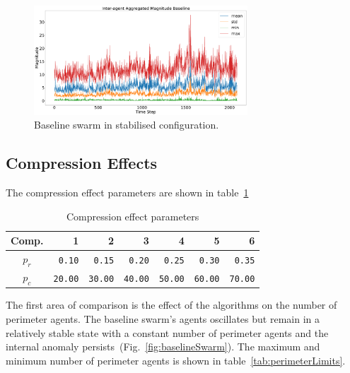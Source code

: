 \documentclass[12pt,a4paper]{IEEEtran}
\begin{document}
\begin{figure}[H]
	\begin{center}
		\includegraphics[width=8cm]{figures/interagentMagnitudeBaseline}
	\end{center}
	\caption{Baseline swarm in stabilised configuration. \label{fig:baselineSwarmMagnitude}}
\end{figure}

\subsection{Compression Effects\label{sec:CompressionEffect}}

The compression effect parameters are shown in table~\ref{tab:compressionEffect}
\begin{table}[h]
	\centering
	\tiny
	\begin{tabular}{|c|r|r|r|r|r|r|}
		\hline
		\rowcolor[HTML]{000000} 
		{\color[HTML]{FFFFFF} Comp.} & {\color[HTML]{FFFFFF} 1} & {\color[HTML]{FFFFFF} 2} & {\color[HTML]{FFFFFF} 3} & {\color[HTML]{FFFFFF} 4} & {\color[HTML]{FFFFFF} 5} & {\color[HTML]{FFFFFF} 6}\\ \hline
		$p_r$ & \texttt{0.10} & \texttt{0.15} & \texttt{0.20} & \texttt{0.25} & \texttt{0.30} & \texttt{0.35} \\ \hline
		$p_c$ & \texttt{20.00}  & \texttt{30.00} & \texttt{40.00} & \texttt{50.00} & \texttt{60.00} & \texttt{70.00}\\ \hline
	\end{tabular}
	\caption{Compression effect parameters}
	\label{tab:compressionEffect}
\end{table}

The first area of comparison is the effect of the algorithms on the number of perimeter agents. The baseline swarm's agents oscillates but remain in a relatively stable state with a constant number of perimeter agents and the internal anomaly persists~(Fig.~\ref{fig:baselineSwarm}). The maximum and minimum number of perimeter agents is shown in table~\ref{tab:perimeterLimits}. 
\end{document}

